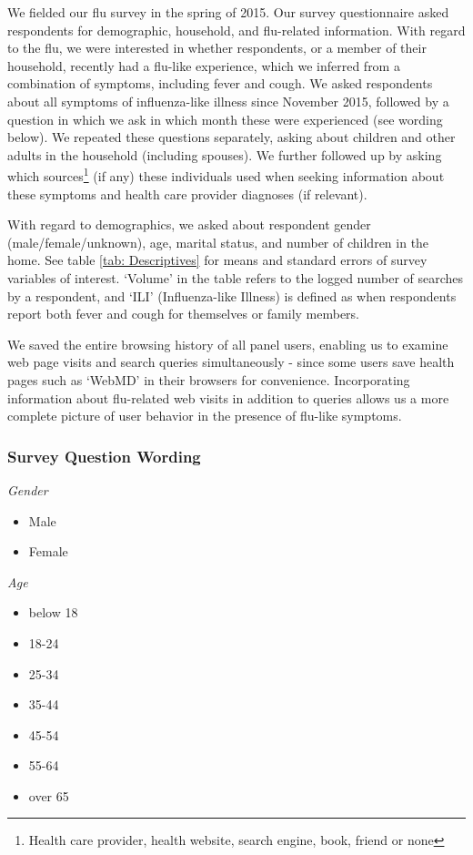 \documentclass[12pt]{article}
\begin{document}
We fielded our flu survey in the spring of 2015. Our survey questionnaire asked respondents for demographic, household, and flu-related information. With regard to the flu, we were interested in whether respondents, or a member of their household, recently had a flu-like experience, which we inferred from a combination of symptoms, including fever and cough. We asked respondents about all symptoms of influenza-like illness since November 2015, followed by a question in which we ask in which month these were experienced (see wording below). We repeated these questions separately, asking about children and other adults in the household (including spouses). We further followed up by asking which sources\footnote{Health care provider, health website, search engine, book, friend or none} (if any) these individuals used when seeking information about these symptoms and health care provider diagnoses (if relevant). %

With regard to demographics, we asked about respondent gender (male/female/unknown), age, marital status, and number of children in the home. See table \ref{tab: Descriptives} for means and standard errors of survey variables of interest. `Volume' in the table refers to the logged number of searches by a respondent, and `ILI' (Influenza-like Illness) is defined as when respondents report both fever and cough for themselves or family members.

We saved the entire browsing history of all panel users, enabling us to examine web page visits and search queries simultaneously - since some users save health pages such as `WebMD' in their browsers for convenience. Incorporating information about flu-related web visits in addition to queries allows us a more complete picture of user behavior in the presence of flu-like symptoms.  

\subsubsection*{Survey Question Wording}

\emph{Gender}
\begin{itemize}
\item Male
\item Female
\end{itemize}

\emph{Age}
\begin{itemize}
\item below 18
\item 18-24
\item 25-34
\item 35-44
\item 45-54
\item 55-64
\item over 65
\end{itemize}
\end{document}
